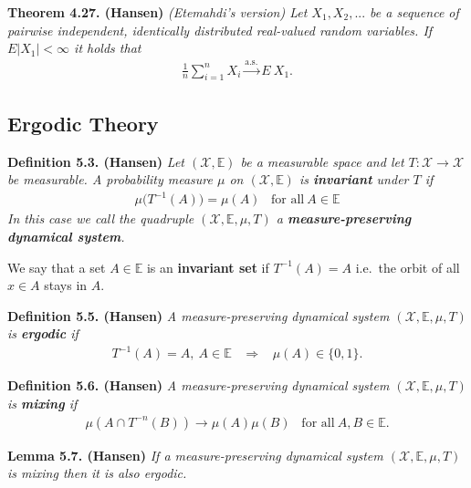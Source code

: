 \documentclass[
]{book}
\begin{document}
\textbf{Theorem 4.27. (Hansen)} \emph{(Etemahdi's version) Let \(X_1,X_2,...\) be a sequence of pairwise independent, identically distributed real-valued random variables. If \(E\vert X_1\vert<\infty\) it holds that}
\begin{align*}
    \frac{1}{n}\sum_{i=1}^nX_i\stackrel{\text{a.s.}}{\to} E\ X_1.\tag{4.30}
\end{align*}

\hypertarget{ergodic-theory}{%
\subsection{Ergodic Theory}\label{ergodic-theory}}

\textbf{Definition 5.3. (Hansen)} \emph{Let \((\mathcal{X},\mathbb{E})\) be a measurable space and let \(T : \mathcal{X}\to \mathcal{X}\) be measurable. A probability measure \(\mu\) on \((\mathcal{X},\mathbb{E})\) is \textbf{invariant} under \(T\) if}
\begin{align*}
    \mu\big(T^{-1}(A)\big)=\mu(A)\hspace{10pt}\text{for all}\ A\in\mathbb{E}\tag{5.5}
\end{align*}
\emph{In this case we call the quadruple \((\mathcal{X},\mathbb{E},\mu,T)\) a \textbf{measure-preserving dynamical system}.}

We say that a set \(A\in\mathbb{E}\) is an \textbf{invariant set} if \(T^{-1}(A)=A\) i.e.~the orbit of all \(x\in A\) stays in \(A\).

\textbf{Definition 5.5. (Hansen)} \emph{A measure-preserving dynamical system \((\mathcal{X},\mathbb{E},\mu,T)\) is \textbf{ergodic} if}
\begin{align*}
    T^{-1}(A)=A,\ A\in\mathbb{E} \hspace{10pt}\Rightarrow\hspace{10pt} \mu(A)\in\{0,1\}.\tag{5.7}
\end{align*}

\textbf{Definition 5.6. (Hansen)} \emph{A measure-preserving dynamical system \((\mathcal{X},\mathbb{E},\mu,T)\) is \textbf{mixing} if}
\begin{align*}
    \mu(A\cap T^{-n}(B))\to \mu(A)\mu(B)\hspace{10pt}\text{for all}\ A,B\in\mathbb{E}.\tag{5.8}
\end{align*}

\textbf{Lemma 5.7. (Hansen)} \emph{If a measure-preserving dynamical system \((\mathcal{X},\mathbb{E},\mu,T)\) is mixing then it is also ergodic.}
\end{document}
